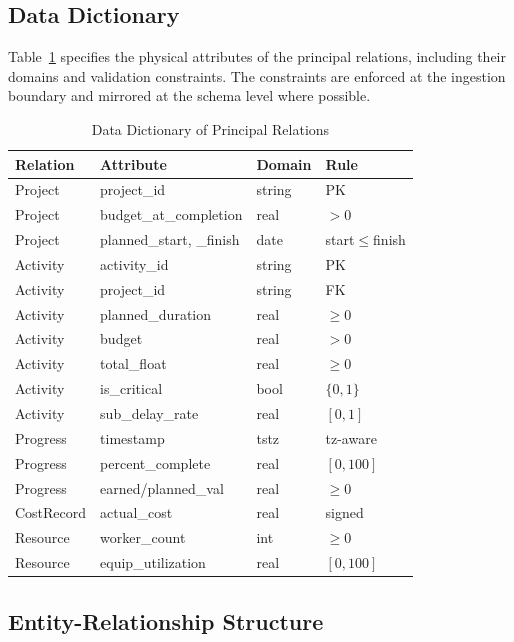 \documentclass[conference]{IEEEtran}
\begin{document}
\subsection{Data Dictionary}

Table~\ref{tab:dict} specifies the physical attributes of the principal relations, including their domains and validation constraints. The constraints are enforced at the ingestion boundary and mirrored at the schema level where possible.

\begin{table}[t]
\caption{Data Dictionary of Principal Relations}
\label{tab:dict}
\centering
\scriptsize
\setlength{\tabcolsep}{2.5pt}
\begin{tabular}{@{}p{1.4cm}p{1.9cm}p{1.3cm}p{1.15cm}@{}}
\toprule
\textbf{Relation} & \textbf{Attribute} & \textbf{Domain} & \textbf{Rule} \\
\midrule
Project & project\_id & string & PK \\
Project & budget\_at\_completion & real & $>0$ \\
Project & planned\_start, \_finish & date & start$\le$finish \\
Activity & activity\_id & string & PK \\
Activity & project\_id & string & FK \\
Activity & planned\_duration & real & $\ge 0$ \\
Activity & budget & real & $>0$ \\
Activity & total\_float & real & $\ge 0$ \\
Activity & is\_critical & bool & $\{0,1\}$ \\
Activity & sub\_delay\_rate & real & $[0,1]$ \\
Progress & timestamp & tstz & tz-aware \\
Progress & percent\_complete & real & $[0,100]$ \\
Progress & earned/planned\_val & real & $\ge 0$ \\
CostRecord & actual\_cost & real & signed \\
Resource & worker\_count & int & $\ge 0$ \\
Resource & equip\_utilization & real & $[0,100]$ \\
\bottomrule
\end{tabular}
\end{table}

\subsection{Entity-Relationship Structure}
\end{document}
